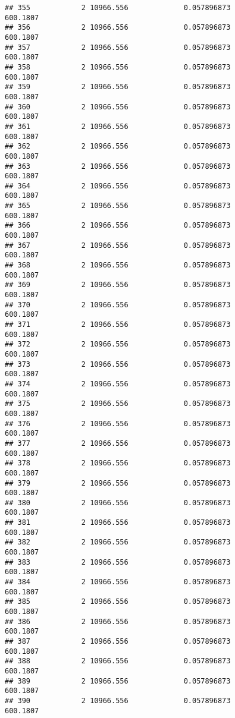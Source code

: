 \documentclass[]{article}
\begin{document}
\begin{verbatim}
## 355            2 10966.556             0.057896873           600.1807
## 356            2 10966.556             0.057896873           600.1807
## 357            2 10966.556             0.057896873           600.1807
## 358            2 10966.556             0.057896873           600.1807
## 359            2 10966.556             0.057896873           600.1807
## 360            2 10966.556             0.057896873           600.1807
## 361            2 10966.556             0.057896873           600.1807
## 362            2 10966.556             0.057896873           600.1807
## 363            2 10966.556             0.057896873           600.1807
## 364            2 10966.556             0.057896873           600.1807
## 365            2 10966.556             0.057896873           600.1807
## 366            2 10966.556             0.057896873           600.1807
## 367            2 10966.556             0.057896873           600.1807
## 368            2 10966.556             0.057896873           600.1807
## 369            2 10966.556             0.057896873           600.1807
## 370            2 10966.556             0.057896873           600.1807
## 371            2 10966.556             0.057896873           600.1807
## 372            2 10966.556             0.057896873           600.1807
## 373            2 10966.556             0.057896873           600.1807
## 374            2 10966.556             0.057896873           600.1807
## 375            2 10966.556             0.057896873           600.1807
## 376            2 10966.556             0.057896873           600.1807
## 377            2 10966.556             0.057896873           600.1807
## 378            2 10966.556             0.057896873           600.1807
## 379            2 10966.556             0.057896873           600.1807
## 380            2 10966.556             0.057896873           600.1807
## 381            2 10966.556             0.057896873           600.1807
## 382            2 10966.556             0.057896873           600.1807
## 383            2 10966.556             0.057896873           600.1807
## 384            2 10966.556             0.057896873           600.1807
## 385            2 10966.556             0.057896873           600.1807
## 386            2 10966.556             0.057896873           600.1807
## 387            2 10966.556             0.057896873           600.1807
## 388            2 10966.556             0.057896873           600.1807
## 389            2 10966.556             0.057896873           600.1807
## 390            2 10966.556             0.057896873           600.1807

\end{verbatim}
\end{document}

